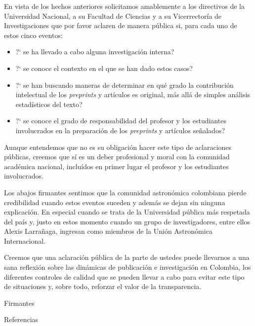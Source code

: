 \documentclass[11pt]{article}
\begin{document}
En vista de los hechos anteriores solicitamos amablemente a los
directivos de la Universidad Nacional, a  su Facultad de Ciencias y a
su Vicerrector\'ia de Investigaciones que por favor aclaren de manera
p\'ublica si, para cada uno de estos cinco eventos:  
\begin{itemize}
\item ?` se ha llevado a cabo alguna investigaci\'on interna?
\item ?` se conoce el contexto en el que se han dado estos casos?
\item ?` se han buscando maneras de determinar en qu\'e grado la contribuci\'on intelectual de los \textit{preprints} y art\'iculos es original, m\'as all\'a de simples an\'alisis estad\'isticos del texto?
\item ?` se conoce el grado de responsabilidad del profesor y los estudiantes involucrados en la preparaci\'on de los \textit{preprints} y art\'iculos se\~nalados?
\end{itemize}

Aunque entendemos que no es su obligaci\'on hacer este tipo de
aclaraciones p\'ublicas, creemos que s\'i es un deber profesional y moral
con la comunidad acad\'emica nacional, inclu\'idos en primer lugar el
profesor y los estudiantes involucrados. 

Los abajos firmantes sentimos que la comunidad astron\'omica colombiana
pierde credibilidad cuando estos eventos suceden y adem\'as se dejan sin
ninguna explicaci\'on. En especial cuando se trata de la Universidad
p\'ublica m\'as respetada del pa\'is y, justo en estos momento cuando un
grupo de investigadores, entre ellos Alexis Larra\~naga, ingresan como
miembros de la Uni\'on Astron\'omica Internacional. 
 
Creemos que una aclaraci\'on p\'ublica de la parte de ustedes puede
llevarnos a una sana reflexi\'on sobre las din\'amicas de publicaci\'on e
investigaci\'on en Colombia, los diferentes controles de calidad que se
pueden llevar a cabo para evitar este tipo de situaciones y, sobre
todo, reforzar el valor de la transparencia. 


Firmantes

Referencias


\noindent
\end{document}

